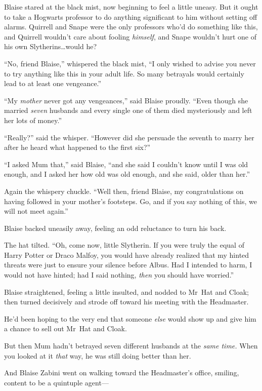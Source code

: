 Blaise stared at the black mist, now beginning to feel a little uneasy. But it
ought to take a Hogwarts professor to do anything significant to him without
setting off alarms. Quirrell and Snape were the only professors who’d do
something like this, and Quirrell wouldn’t care about fooling \emph{himself},
and Snape wouldn’t hurt one of his own Slytherins…would he?

“No, friend Blaise,” whispered the black mist, “I only wished to advise you
never to try anything like this in your adult life. So many betrayals would
certainly lead to at least one vengeance.”

“My \emph{mother} never got any vengeances,” said Blaise proudly. “Even though
she married \emph{seven} husbands and every single one of them died
mysteriously and left her lots of money.”

“Really?” said the whisper. “However did she persuade the seventh to marry her
after he heard what happened to the first six?”

“I asked Mum that,” said Blaise, “and she said I couldn’t know until I was old
enough, and I asked her how old was old enough, and she said, older than her.”

Again the whispery chuckle. “Well then, friend Blaise, my congratulations on
having followed in your mother’s footsteps. Go, and if you say nothing of this,
we will not meet again.”

Blaise backed uneasily away, feeling an odd reluctance to turn his back.

The hat tilted. “Oh, come now, little Slytherin. If you were truly the equal of
Harry Potter or Draco Malfoy, you would have already realized that my hinted
threats were just to ensure your silence before Albus. Had I intended to harm,
I would not have hinted; had I said nothing, \emph{then} you should have
worried.”

Blaise straightened, feeling a little insulted, and nodded to Mr~Hat and
Cloak; then turned decisively and strode off toward his meeting with the
Headmaster.

He’d been hoping to the very end that someone \emph{else} would show up and
give him a chance to sell out Mr~Hat and Cloak.

But then Mum hadn’t betrayed seven different husbands at the \emph{same time.}
When you looked at it \emph{that} way, he was still doing better than her.

And Blaise Zabini went on walking toward the Headmaster’s office, smiling,
content to be a quintuple agent—

